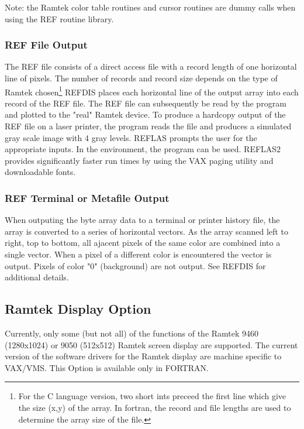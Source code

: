 \documentclass[11pt]{report}
\begin{document}
Note: the Ramtek color table routines and cursor routines are dummy
calls when using the REF routine library.

\subsubsection{REF File Output}

The REF file consists of a direct access file with a record length of
one horizontal line of pixels.  The number of records and record size
depends on the type of Ramtek chosen\footnote{For the C language
version, two short ints preceed the first line which give the size
(x,y) of the array.  In fortran, the record and file lengths are used
to determine the array size of the file.}  REFDIS places each
horizontal line of the output array into each record of the REF file.
The REF file can subsequently be read by the  program and
plotted to the "real" Ramtek device.  To produce a hardcopy output of
the REF file on a  laser printer, the program  reads
the file and produces a simulated gray scale image with 4 gray levels.
REFLAS prompts the user for the appropriate inputs.  In
the  environment, the program  can be used.
REFLAS2 provides significantly faster run times by using the VAX
paging utility and downloadable fonts.

\subsubsection{REF Terminal or Metafile Output}

When outputing the byte array data to a terminal or printer history
file, the array is converted to a series of horizontal vectors.  As
the array scanned left to right, top to bottom, all ajacent pixels of
the same color are combined into a single vector.  When a pixel of a
different color is encountered the vector is output.  Pixels of color
"0" (background) are not output.  See REFDIS for additional details.


\subsection{Ramtek Display Option}

Currently, only some (but not all) of the functions of the Ramtek 9460
(1280x1024) or 9050 (512x512) Ramtek screen display are supported.
The current version of the software drivers for the Ramtek display are
machine specific to VAX/VMS.  This Option is available only in FORTRAN.
\end{document}
